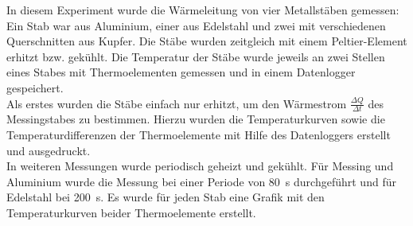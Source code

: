 In diesem Experiment wurde die Wärmeleitung von vier Metallstäben gemessen: Ein Stab war aus Aluminium, einer aus Edelstahl und zwei mit verschiedenen Querschnitten aus Kupfer.
Die Stäbe wurden zeitgleich mit einem Peltier-Element erhitzt bzw. gekühlt. Die Temperatur der Stäbe wurde jeweils an zwei Stellen eines Stabes mit Thermoelementen gemessen und in einem Datenlogger gespeichert. \\
Als erstes wurden die Stäbe einfach nur erhitzt, um den Wärmestrom $\frac{\Delta Q}{\Delta t}$ des Messingstabes zu bestimmen. Hierzu wurden die Temperaturkurven sowie die Temperaturdifferenzen der Thermoelemente mit Hilfe des Datenloggers erstellt und ausgedruckt. \\
In weiteren Messungen wurde periodisch geheizt und gekühlt. Für Messing und Aluminium wurde die Messung bei einer Periode von \SI{80}{\second} durchgeführt und für Edelstahl bei  \SI{200}{\second}. Es wurde für jeden Stab eine Grafik mit den Temperaturkurven beider Thermoelemente erstellt.
